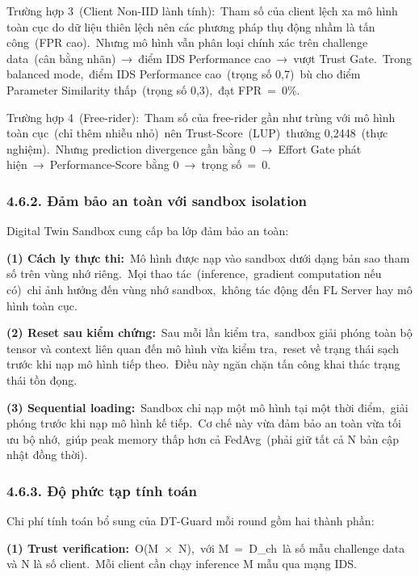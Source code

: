 Trường hợp 3~(Client Non-IID lành tính):~Tham số của client lệch xa mô hình toàn cục do dữ liệu thiên lệch nên các phương pháp thụ động nhầm là tấn công~(FPR cao).~Nhưng mô hình vẫn phân loại chính xác trên challenge data~(cân bằng nhãn)~→~điểm IDS Performance cao~→~vượt Trust Gate.~Trong balanced mode,~điểm IDS Performance cao~(trọng số 0,7)~bù cho điểm Parameter Similarity thấp~(trọng số 0,3),~đạt FPR~=~0\%.

Trường hợp 4~(Free-rider):~Tham số của free-rider gần như trùng với mô hình toàn cục~(chỉ thêm nhiễu nhỏ)~nên Trust-Score~(LUP)~thưởng 0,2448~(thực nghiệm).~Nhưng prediction divergence gần bằng 0~→~Effort Gate phát hiện~→~Performance-Score bằng 0~→~trọng số~=~0.

\subsubsection{4.6.2. Đảm bảo an toàn với sandbox isolation}\label{ux111ux1ea3m-bux1ea3o-an-touxe0n-vux1edbi-sandbox-isolation}

Digital Twin Sandbox cung cấp ba lớp đảm bảo an toàn:

\textbf{(1) Cách ly thực thi:}~Mô hình được nạp vào sandbox dưới dạng bản sao tham số trên vùng nhớ riêng.~Mọi thao tác~(inference,~gradient computation nếu có)~chỉ ảnh hưởng đến vùng nhớ sandbox,~không tác động đến FL Server hay mô hình toàn cục.

\textbf{(2) Reset sau kiểm chứng:}~Sau mỗi lần kiểm tra,~sandbox giải phóng toàn bộ tensor và context liên quan đến mô hình vừa kiểm tra,~reset về trạng thái sạch trước khi nạp mô hình tiếp theo.~Điều này ngăn chặn tấn công khai thác trạng thái tồn đọng.

\textbf{(3) Sequential loading:}~Sandbox chỉ nạp một mô hình tại một thời điểm,~giải phóng trước khi nạp mô hình kế tiếp.~Cơ chế này vừa đảm bảo an toàn vừa tối ưu bộ nhớ,~giúp peak memory thấp hơn cả FedAvg~(phải giữ tất cả N bản cập nhật đồng thời).

\subsubsection{4.6.3. Độ phức tạp tính toán}\label{ux111ux1ed9-phux1ee9c-tux1ea1p-tuxednh-touxe1n}

Chi phí tính toán bổ sung của DT-Guard mỗi round gồm hai thành phần:

\textbf{(1) Trust verification:}~O(M~×~N),~với M~=~\textbar D\_ch\textbar~là số mẫu challenge data và N là số client.~Mỗi client cần chạy inference M mẫu qua mạng IDS.

